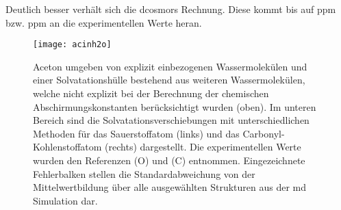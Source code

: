 Deutlich besser verhält sich die \ac{dcosmors} Rechnung. Diese kommt bis auf \unit[9]{ppm} bzw. \unit[3]{ppm} an die experimentellen Werte heran. 
	\begin{figure}[ht!]
	\centering
	\texttt{[image: acinh2o]}
	\captionsetup{figurewithin = chapter}
	\captionsetup{font=small, labelfont=bf}\caption[Solvatationseffekt für Aceton in Wasser]{Aceton umgeben von explizit einbezogenen Wassermolekülen und einer Solvatationshülle bestehend aus weiteren Wassermolekülen, welche nicht explizit bei der Berechnung der chemischen Abschirmungskonstanten berücksichtigt wurden (oben). Im unteren Bereich sind die Solvatationsverschiebungen mit unterschiedlichen Methoden für das Sauerstoffatom (links) und das Carbonyl-Kohlenstoffatom (rechts) dargestellt. Die experimentellen Werte wurden den Referenzen \cite{cossi2003different} (O) und \cite{tiffon1978effet} (C) entnommen. Eingezeichnete Fehlerbalken stellen die Standardabweichung von der Mittelwertbildung über alle ausgewählten Strukturen aus der \ac{md} Simulation dar.}
\label{abb:acinh2o}
\end{figure}
\FloatBarrier
